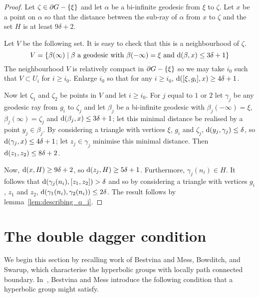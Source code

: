 \documentclass[a4paper]{article}
\begin{document}
\begin{proof}
  Let $\zeta \in \partial G - \left\{\xi\right\}$ and let $\alpha$ be a bi-infinite
  geodesic from $\xi$ to $\zeta$. Let $x$ be a point on $\alpha$ so that the
  distance between the sub-ray of $\alpha$ from $x$ to $\zeta$ and the set $H$
  is at least $9\delta+2$.

  Let $V$ be the following set. It is easy to check that this is a
  neighbourhood of $\zeta$.
  \begin{equation*}
    V = \left\{\beta(\infty) \mid \text{$\beta$ a geodesic with
            $\beta(-\infty) = \xi$ and $\operatorname{d}(\beta, x) \leq 3\delta+1$}\right\}
  \end{equation*}
  The neighbourhood $V$ is relatively compact in $\partial G - \left\{\xi\right\}$ so
  we may take $i_0$ such that $V \subset U_i$ for $i \geq i_0$. Enlarge $i_0$
  so that for any $i \geq i_0$, $\operatorname{d}([\xi, g_i], x) \geq 4\delta+1$.

  Now let $\zeta_1$ and $\zeta_2$ be points in $V$ and let $i \geq i_0$. For
  $j$ equal to $1$ or $2$ let $\gamma_j$ be any geodesic ray from $g_i$ to
  $\zeta_j$ and let $\beta_j$ be a bi-infinite geodesic with $\beta_j(-\infty) =
  \xi$, $\beta_j(\infty) = \zeta_j$ and $\operatorname{d}(\beta_j, x) \leq 3\delta+1$; let
  this minimal distance be realised by a point $y_j \in \beta_j$. By
  considering a triangle with vertices $\xi$, $g_i$ and $\zeta_j$, $\operatorname{d}(y_j,
  \gamma_j) \leq \delta$, so $\operatorname{d}(\gamma_j, x) \leq 4\delta+1$; let $z_j \in
  \gamma_j$ minimise this minimal distance. Then $\operatorname{d}(z_1, z_2) \leq
  8\delta+2$.

  Now, $\operatorname{d}(x, H) \geq 9\delta+2$, so $\operatorname{d}(z_j, H) \geq 5\delta+1$.
  Furthermore, $\gamma_j(n_i) \in H$. It follows that $\operatorname{d}(\gamma_j(n_i), [z_1,
  z_2]) > \delta$ and so by considering a triangle with vertices $g_i$, $z_1$
  and $z_2$, $\operatorname{d}(\gamma_1(n_i), \gamma_2(n_i)) \leq 2\delta$. The result
  follows by lemma~\ref{lem:describing_q_i}. 
\end{proof}

\section{The double dagger condition}

We begin this section by recalling work of Bestvina and Mess, Bowditch, and
Swarup, which characterise the hyperbolic groups with locally path connected
boundary. In~\cite{bestvinamess91}, Bestvina and Mess introduce the following
condition that a hyperbolic group might satisfy.
\end{document}
